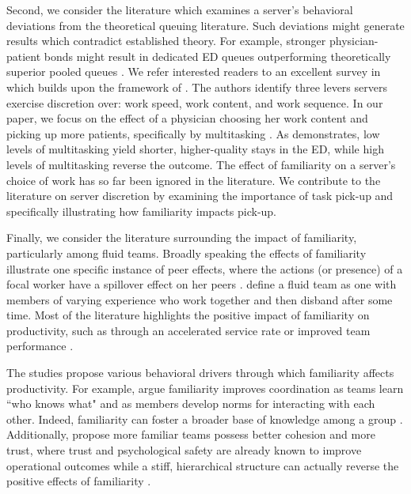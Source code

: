  Second, we consider the literature which examines a server’s behavioral deviations from the theoretical queuing literature. Such deviations might generate results which contradict established theory. For example, stronger physician-patient bonds might result in dedicated ED queues outperforming theoretically superior pooled queues \citep{Song2015}. We refer interested readers to an excellent survey in \cite{Allon2019} which builds upon the framework of \cite{Delasay2018}. The authors identify three levers servers exercise discretion over: work speed, work content, and work sequence. In our paper, we focus on the effect of a physician choosing her work content and picking up more patients, specifically by multitasking \citep{KC2014,KC2020_productivity}. As \cite{KC2014} demonstrates, low levels of multitasking yield shorter, higher-quality stays in the ED, while high levels of multitasking reverse the outcome. The effect of familiarity on a server’s choice of work has so far been ignored in the literature. We contribute to the literature on server discretion by examining the importance of task pick-up and specifically illustrating how familiarity impacts pick-up.
 
 Finally, we consider the literature surrounding the impact of familiarity, particularly among fluid teams. Broadly speaking the effects of familiarity illustrate one specific instance of peer effects, where the actions (or presence) of a focal worker have a spillover effect on her peers \citep[e.g.,][]{Mas2009}. \cite{Huckman2011} define a fluid team as one with members of varying experience who work together and then disband after some time. Most of the literature highlights the positive impact of familiarity on productivity, such as through an accelerated service rate \citep{Reagans2005,Avgerinos2017,Aksin2020} or improved team performance \citep{Huckman2011,Kim2021}. 
 
 The studies propose various behavioral drivers through which familiarity affects productivity. For example, \cite{Reagans2005} argue familiarity improves coordination as teams learn “who knows what" and as members develop norms for interacting with each other. Indeed, familiarity can foster a broader base of knowledge among a group \citep{Aksin2020,Huckman2011}. Additionally, \cite{Avgerinos2017} propose more familiar teams possess better cohesion and more trust, where trust and psychological safety are already known to improve operational outcomes \citep{Edmondson1999,Tucker2003,Siemsen2009} while a stiff, hierarchical structure can actually reverse the positive effects of familiarity \citep{Kim2021}.
 
